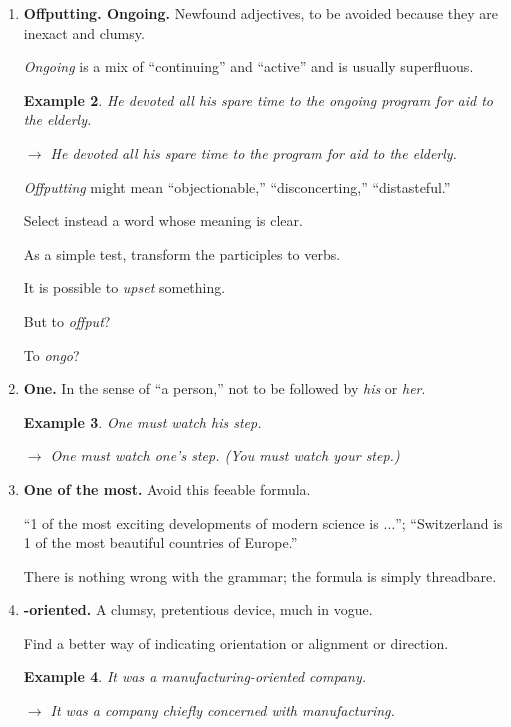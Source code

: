 \documentclass{book}
\numberwithin{equation}{section}
\newtheorem{example}{Example}[chapter]
\begin{document}
\begin{enumerate}
\begin{example}
        The theater troupe debuted last fall.
        
        $\to$ The theater troupe made its debut last fall.
    \end{example}
    \item \textbf{Offputting. Ongoing.} Newfound adjectives, to be avoided because they are inexact and clumsy.
    
    \textit{Ongoing} is a mix of ``continuing'' and ``active'' and is usually superfluous.
    \begin{example}
        He devoted all his spare time to the ongoing program for aid to the elderly.
        
        $\to$ He devoted all his spare time to the program for aid to the elderly.
    \end{example}
    \textit{Offputting} might mean ``objectionable,'' ``disconcerting,'' ``distasteful.''
    
    Select instead a word whose meaning is clear.
    
    As a simple test, transform the participles to verbs.
    
    It is possible to \textit{upset} something.
    
    But to \textit{offput}?
    
    To \textit{ongo}?
    \item \textbf{One.} In the sense of ``a person,'' not to be followed by \textit{his} or \textit{her}.
    \begin{example}
        One must watch his step.
        
        $\to$ One must watch one's step. (You must watch your step.)
    \end{example}
    \item \textbf{One of the most.} Avoid this feeable formula.
    
    ``1 of the most exciting developments of modern science is $\ldots$''; ``Switzerland is 1 of the most beautiful countries of Europe.''
    
    There is nothing wrong with the grammar; the formula is simply threadbare.
    \item \textbf{-oriented.} A clumsy, pretentious device, much in vogue.
    
    Find a better way of indicating orientation or alignment or direction.
    \begin{example}
        It was a manufacturing-oriented company.
        
        $\to$ It was a company chiefly concerned with manufacturing.
        

\end{example}
\end{enumerate}
\end{document}

